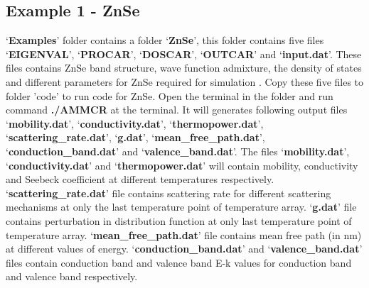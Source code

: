 \documentclass[12pt]{article}
\begin{document}
\subsection{Example 1 - ZnSe}
\lq \textbf{Examples}\rq \hspace{0.5mm} folder contains a folder \lq \textbf{ZnSe}\rq \hspace{0.5mm}, this folder contains five files \lq \textbf{EIGENVAL}\rq \hspace{0.5mm}, \lq \textbf{PROCAR}\rq \hspace{0.5mm}, \lq \textbf{DOSCAR}\rq \hspace{0.5mm}, \lq \textbf{OUTCAR}\rq \hspace{0.5mm} and \lq \textbf{input.dat}\rq \hspace{0.5mm}. These files contains ZnSe band structure, wave function admixture, the density of states and different parameters for ZnSe required for simulation \cite{anup1}. Copy these five files to folder 'code' to run code for ZnSe. Open the terminal in the folder and run command \textbf{./AMMCR} at the terminal. It will generates following output files \lq \textbf{mobility.dat}\rq \hspace{0.5mm}, \lq \textbf{conductivity.dat}\rq \hspace{0.5mm}, \lq \textbf{thermopower.dat}\rq \hspace{0.5mm}, \lq \textbf{scattering\_rate.dat}\rq \hspace{0.5mm}, \lq \textbf{g.dat}\rq \hspace{0.5mm}, \lq \textbf{mean\_free\_path.dat}\rq \hspace{0.5mm}, \lq \textbf{conduction\_band.dat}\rq \hspace{0.5mm} and \lq \textbf{valence\_band.dat}\rq \hspace{0.5mm}. The files \lq \textbf{mobility.dat}\rq \hspace{0.5mm}, \lq \textbf{conductivity.dat}\rq \hspace{0.5mm} and \lq \textbf{thermopower.dat}\rq \hspace{0.5mm} will contain mobility, conductivity and  Seebeck coefficient at different temperatures respectively. \lq \textbf{scattering\_rate.dat}\rq \hspace{0.5mm}  file contains scattering rate for different scattering mechanisms at only the last temperature point of temperature array. \lq \textbf{g.dat}\rq \hspace{0.5mm} file contains perturbation in distribution function at only last temperature point of temperature array. \lq \textbf{mean\_free\_path.dat}\rq \hspace{0.5mm} file contains mean free path (in nm) at different values of energy. \lq \textbf{conduction\_band.dat}\rq \hspace{0.5mm} and \lq \textbf{valence\_band.dat}\rq \hspace{0.5mm} files contain conduction band and valence band E-k values for conduction band and valence band respectively.
 
\end{document}
